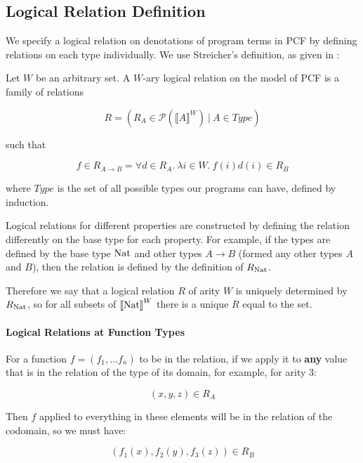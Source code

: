 \subsection{Logical Relation Definition}
We specify a logical relation on denotations of program terms in PCF  by defining relations on each type individually. We use Streicher's definition, as given in \citep{Streicher06}: 

\vspace{0.5cm}

\begin{defn}
Let $W$ be an arbitrary set.  A $W$-ary logical relation on the model of PCF is a family of relations

\[R = (R_A \in \mathcal{P}(\llbracket A \rrbracket^W) \ | \ A \in Type)\]

such that

\[f \in R_{A \to B} = \forall d \in R_A. \ \lambda i \in W. \ f(i)d(i) \in R_B\]
\end{defn}

where $Type$ is the set of all possible types our programs can have, defined by induction.

Logical relations for different properties are constructed by defining the relation differently on the base type for each property. For example, if the types are defined by the base type $\operatorname{Nat}$ and other types $A \to B$ (formed any other types $A$ and $B$), then the relation is defined by the definition of $R_{\operatorname{Nat}}$.

Therefore we say that a logical relation $R$ of arity $W$ is uniquely determined by $R_{\operatorname{Nat}}$, so for all subsets of ${\llbracket \operatorname{Nat} \rrbracket}^W$ there is a unique $R$ equal to the set. 

\vspace{0.5cm}

\paragraph{Logical Relations at Function Types}

For a function $f = (f_1, \dots f_n)$ to be in the relation, if we apply it to \textbf{any} value that is in the relation of the type of its domain, for example, for arity $3$:

\[ (x,y,z) \in R_A \]

Then $f$ applied to everything in these elements will be in the relation of the codomain, so we must have:

\[ (f_1(x),f_2(y),f_3(z)) \in R_B \]

